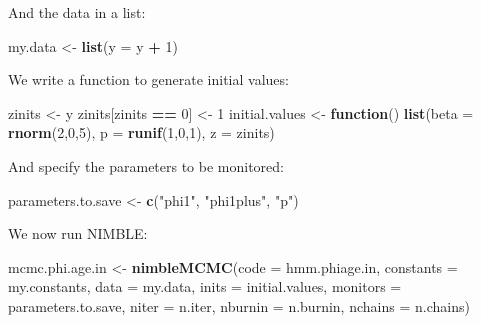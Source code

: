 \documentclass[
  12pt,
]{krantz}
\newenvironment{Shaded}{\begin{snugshade}}{\end{snugshade}}
\newcommand{\AttributeTok}[1]{\textcolor[rgb]{0.13,0.29,0.53}{#1}}
\newcommand{\ControlFlowTok}[1]{\textcolor[rgb]{0.13,0.29,0.53}{\textbf{#1}}}
\newcommand{\DecValTok}[1]{\textcolor[rgb]{0.00,0.00,0.81}{#1}}
\newcommand{\FunctionTok}[1]{\textcolor[rgb]{0.13,0.29,0.53}{\textbf{#1}}}
\newcommand{\NormalTok}[1]{#1}
\newcommand{\OtherTok}[1]{\textcolor[rgb]{0.56,0.35,0.01}{#1}}
\newcommand{\SpecialCharTok}[1]{\textcolor[rgb]{0.81,0.36,0.00}{\textbf{#1}}}
\newcommand{\StringTok}[1]{\textcolor[rgb]{0.31,0.60,0.02}{#1}}
\begin{document}
And the data in a list:

\begin{Shaded}
\begin{Highlighting}[]
\NormalTok{my.data }\OtherTok{\textless{}{-}} \FunctionTok{list}\NormalTok{(}\AttributeTok{y =}\NormalTok{ y }\SpecialCharTok{+} \DecValTok{1}\NormalTok{)}
\end{Highlighting}
\end{Shaded}

We write a function to generate initial values:

\begin{Shaded}
\begin{Highlighting}[]
\NormalTok{zinits }\OtherTok{\textless{}{-}}\NormalTok{ y}
\NormalTok{zinits[zinits }\SpecialCharTok{==} \DecValTok{0}\NormalTok{] }\OtherTok{\textless{}{-}} \DecValTok{1}
\NormalTok{initial.values }\OtherTok{\textless{}{-}} \ControlFlowTok{function}\NormalTok{() }\FunctionTok{list}\NormalTok{(}\AttributeTok{beta =} \FunctionTok{rnorm}\NormalTok{(}\DecValTok{2}\NormalTok{,}\DecValTok{0}\NormalTok{,}\DecValTok{5}\NormalTok{),}
                                  \AttributeTok{p =} \FunctionTok{runif}\NormalTok{(}\DecValTok{1}\NormalTok{,}\DecValTok{0}\NormalTok{,}\DecValTok{1}\NormalTok{),}
                                  \AttributeTok{z =}\NormalTok{ zinits)}
\end{Highlighting}
\end{Shaded}

And specify the parameters to be monitored:

\begin{Shaded}
\begin{Highlighting}[]
\NormalTok{parameters.to.save }\OtherTok{\textless{}{-}} \FunctionTok{c}\NormalTok{(}\StringTok{"phi1"}\NormalTok{, }\StringTok{"phi1plus"}\NormalTok{, }\StringTok{"p"}\NormalTok{)}
\end{Highlighting}
\end{Shaded}

We now run NIMBLE:

\begin{Shaded}
\begin{Highlighting}[]
\NormalTok{mcmc.phi.age.in }\OtherTok{\textless{}{-}} \FunctionTok{nimbleMCMC}\NormalTok{(}\AttributeTok{code =}\NormalTok{ hmm.phiage.in, }
                              \AttributeTok{constants =}\NormalTok{ my.constants,}
                              \AttributeTok{data =}\NormalTok{ my.data,              }
                              \AttributeTok{inits =}\NormalTok{ initial.values,}
                              \AttributeTok{monitors =}\NormalTok{ parameters.to.save,}
                              \AttributeTok{niter =}\NormalTok{ n.iter,}
                              \AttributeTok{nburnin =}\NormalTok{ n.burnin, }
                              \AttributeTok{nchains =}\NormalTok{ n.chains)}
\end{Highlighting}
\end{Shaded}
\end{document}
